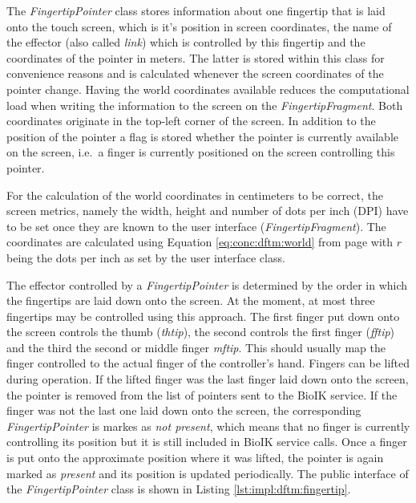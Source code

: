 The \textit{FingertipPointer} class stores information about one fingertip that is laid onto the touch screen, which is it's position in screen coordinates, the name of the effector (also called \textit{link}) which is controlled by this fingertip and the coordinates of the pointer in meters. The latter is stored within this class for convenience reasons and is calculated whenever the screen coordinates of the pointer change. Having the world coordinates available reduces the computational load when writing the information to the screen on the \textit{FingertipFragment}. Both coordinates originate in the top-left corner of the screen. In addition to the position of the pointer a flag is stored whether the pointer is currently available on the screen, i.e.~a finger is currently positioned on the screen controlling this pointer.

For the calculation of the world coordinates in centimeters to be correct, the screen metrics, namely the width, height and number of dots per inch (DPI) have to be set once they are known to the user interface (\textit{FingertipFragment}). The coordinates are calculated using Equation \ref{eq:conc:dftm:world} from page \pageref{eq:conc:dftm:world} with $r$ being the dots per inch as set by the user interface class.

The effector controlled by a \textit{FingertipPointer} is determined by the order in which the fingertips are laid down onto the screen. At the moment, at most three fingertips may be controlled using this approach. The first finger put down onto the screen controls the thumb (\textit{thtip}), the second controls the first finger (\textit{fftip}) and the third the second or middle finger \textit{mftip}. This should usually map the finger controlled to the actual finger of the controller's hand. Fingers can be lifted during operation. If the lifted finger was the last finger laid down onto the screen, the pointer is removed from the list of pointers sent to the BioIK service. If the finger was not the last one laid down onto the screen, the corresponding \textit{FingertipPointer} is markes as \textit{not present}, which means that no finger is currently controlling its position but it is still included in BioIK service calls. Once a finger is put onto the approximate position where it was lifted, the pointer is again marked as \textit{present} and its position is updated periodically. The public interface of the \textit{FingertipPointer} class is shown in Listing \ref{lst:impl:dftm:fingertip}.

